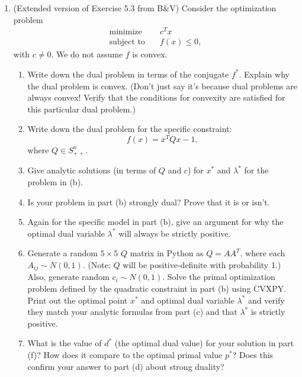 \documentclass[11pt]{article}
\begin{document}
\begin{enumerate}

\item (Extended version of Exercise 5.3 from B\&V) Consider the optimization
  problem
  \begin{align*}
    \text{minimize} \quad & c^T x \\
    \text{subject to} \quad & f(x) \leq 0,
  \end{align*}
  with $c \neq 0$. We do not assume $f$ is convex.

  \begin{enumerate}
    \item Write down the dual problem in terms of the conjugate $f^*$. Explain
      why the dual problem is convex. (Don't just say it's because dual problems
      are always convex! Verify that the conditions for convexity are satisfied
      for this particular dual problem.)

    \item Write down the dual problem for the specific constraint:
      $$f(x) = x^T Q x - 1,$$
      where $Q \in S_{++}^n$.

    \item Give analytic solutions (in terms of $Q$ and $c$) for $x^*$ and
      $\lambda^*$ for the problem in (b).

    \item Is your problem in part (b) strongly dual? Prove that it is or isn't.

    \item Again for the specific model in part (b), give an argument for why the
      optimal dual variable $\lambda^*$ will always be strictly positive.

    \item Generate a random $5 \times 5$ $Q$ matrix in Python as $Q = A A^T$,
      where each $A_{ij} \sim N(0, 1)$. (Note: $Q$ will be positive-definite
      with probability 1.) Also, generate random $c_i \sim N(0,1)$. Solve the
      primal optimization problem defined by the quadratic constraint in part
      (b) using CVXPY. Print out the optimal point $x^*$ and optimal dual
      variable $\lambda^*$ and verify they match your analytic formulas from
      part (c) and that $\lambda^*$ is strictly positive.

    \item What is the value of $d^*$ (the optimal dual value) for your solution
      in part (f)? How does it compare to the optimal primal value $p^*$? Does
      this confirm your answer to part (d) about strong duality?


\end{enumerate}
\end{enumerate}
\end{document}
